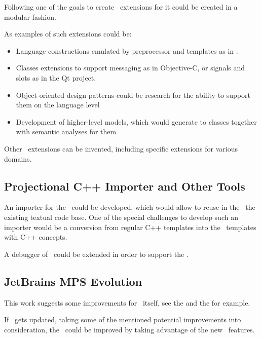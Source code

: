 Following one of the goals to create \pcpp\ extensions for it could be created in a 
modular fashion.

As examples of such extensions could be:
\begin{itemize}
 \item Language constructions emulated by preprocessor and templates as in \cite{alexandrescumeta}.
 \item Classes extensions to support messaging as in Objective-C, or signals and slots as in the Qt project.
 \item Object-oriented design patterns could be research for the ability to support them on the 
 language level
 \item Development of higher-level models, which would generate to classes together with semantic analyses for them
\end{itemize}

Other \pcpp\ extensions can be invented, including specific extensions for various domains.


\subsection{Projectional C++ Importer and Other Tools}
An importer for the \pcpp\ could be developed, which would allow to reuse in the \pcpp\ the
existing textual code base. One of the special challenges to develop such an importer would 
be a conversion from regular C++ templates into the \pcpp\ templates with C++ concepts.

A debugger of \mbdr\ could be extended in order to support the \pcpp.


\subsection{JetBrains MPS Evolution}

This work suggests some improvements for \jbmps\ itself, see the  and the 
 for example.

If \jbmps\ gets updated, taking some of the mentioned potential improvements into consideration,
the \pcpp\ could be improved by taking advantage of the new \jbmps\ features.